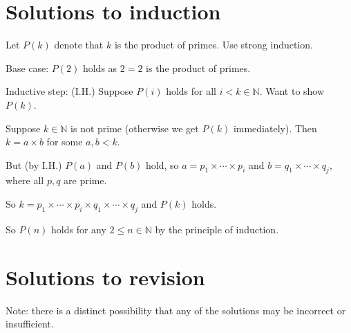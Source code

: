 \documentclass[10pt,a4paper]{article}
\begin{document}
\newpage

\section{Solutions to induction}
Let \(P(k)\) denote that \(k\) is the product of primes.
Use strong induction.

Base case: \(P(2)\) holds as \(2 = 2\) is the product of primes.

Inductive step:
(I.H.) Suppose \(P(i)\) holds for all \(i < k \in \mathbb{N}\).
Want to show \(P(k)\).

Suppose \(k \in \mathbb{N} \) is not prime (otherwise we get \(P(k)\) immediately).
Then \( k = a \times b \) for some \( a, b < k \).

But (by I.H.) \(P(a)\) and \(P(b)\) hold, so \( a = p_1 \times \cdots \times p_i \) and 
\( b = q_1 \times \cdots \times q_j \), where all \(p, q\) are prime.

So \( k = p_1 \times \cdots \times p_i \times q_1 \times \cdots \times q_j \) and \( P(k) \) holds.

So \( P(n) \) holds for any \( 2 \le n \in \mathbb{N} \) by the principle of induction.

\section{Solutions to revision}
Note: there is a distinct possibility that any of the solutions may be incorrect or insufficient.
\end{document}
